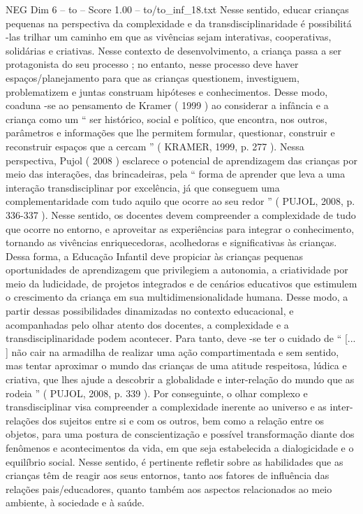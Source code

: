 \begin{textsample}{NEG Dim 6 – to – Score 1.00 – to/to\_inf\_18.txt}
Nesse sentido, educar crianças pequenas na perspectiva da complexidade e da transdisciplinaridade é possibilitá -las trilhar um caminho em que as vivências sejam interativas, cooperativas, solidárias e criativas.
Nesse contexto de desenvolvimento, a criança passa a ser protagonista do seu processo ; no entanto, nesse processo deve haver espaços/planejamento para que as crianças questionem, investiguem, problematizem e juntas construam hipóteses e conhecimentos.
Desse modo, coaduna -se ao pensamento de Kramer ( 1999 ) ao considerar a infância e a criança como um “ ser histórico, social e político, que encontra, nos outros, parâmetros e informações que lhe permitem formular, questionar, construir e reconstruir espaços que a cercam ” ( KRAMER, 1999, p. 277 ).
Nessa perspectiva, Pujol ( 2008 ) esclarece o potencial de aprendizagem das crianças por meio das interações, das brincadeiras, pela “ forma de aprender que leva a uma interação transdisciplinar por excelência, já que conseguem uma complementaridade com tudo aquilo que ocorre ao seu redor ” ( PUJOL, 2008, p. 336-337 ).
Nesse sentido, os docentes devem compreender a complexidade de tudo que ocorre no entorno, e aproveitar as experiências para integrar o conhecimento, tornando as vivências enriquecedoras, acolhedoras e significativas às crianças.
Dessa forma, a Educação Infantil deve propiciar às crianças pequenas oportunidades de aprendizagem que privilegiem a autonomia, a criatividade por meio da ludicidade, de projetos integrados e de cenários educativos que estimulem o crescimento da criança em sua multidimensionalidade humana.
Desse modo, a partir dessas possibilidades dinamizadas no contexto educacional, e acompanhadas pelo olhar atento dos docentes, a complexidade e a transdisciplinaridade podem acontecer.
Para tanto, deve -se ter o cuidado de “ [... ] não cair na armadilha de realizar uma ação compartimentada e sem sentido, mas tentar aproximar o mundo das crianças de uma atitude respeitosa, lúdica e criativa, que lhes ajude a descobrir a globalidade e inter-relação do mundo que as rodeia ” ( PUJOL, 2008, p. 339 ).
Por conseguinte, o olhar complexo e transdisciplinar visa compreender a complexidade inerente ao universo e as inter-relações dos sujeitos entre si e com os outros, bem como a relação entre os objetos, para uma postura de conscientização e possível transformação diante dos fenômenos e acontecimentos da vida, em que seja estabelecida a dialogicidade e o equilíbrio social.
Nesse sentido, é pertinente refletir sobre as habilidades que as crianças têm de reagir aos seus entornos, tanto aos fatores de influência das relações pais/educadores, quanto também aos aspectos relacionados ao meio ambiente, à sociedade e à saúde.

\end{textsample}
